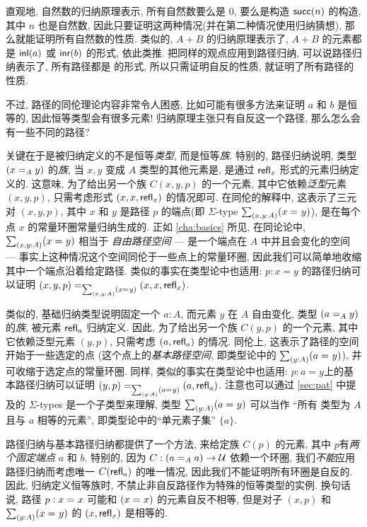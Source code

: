 \begin{rmk}
    \label{rmk:the-only-path-is-refl}
    直观地, 自然数的归纳原理表示, 所有自然数要么是 $0$, 要么是构造 $\suc(n)$ 的构造, 其中 $n$ 也是自然数, 因此只要证明这两种情况(并在第二种情况使用归纳猜想), 那么就能证明所有自然数的性质.
    类似的, $A+B$ 的归纳原理表示了, $A+B$ 的元素都是 $\inl(a)$ 或 $\inr(b)$ 的形式, 依此类推.
    把同样的观点应用到路径归纳, 可以说路径归纳表示了, 所有路径都是  的形式, 所以只需证明自反的性质, 就证明了所有路径的性质.

    不过, 路径的同伦理论内容非常令人困惑, 比如可能有很多方法来证明 $a$ 和 $b$ 是恒等的, 因此恒等类型会有很多元素!
    归纳原理主张只有自反这一个路径, 那么怎么会有一些不同的路径?

    关键在于是被归纳定义的不是恒等\emph{类型}, 而是恒等\emph{族}.
    特别的, 路径归纳说明, 类型 $(\id[A]{x}{y})$ 的\emph{族},  当 $x,y$ 变成 $A$ 类型的其他元素是, 是通过 $\refl{x}$ 形式的元素归纳定义的.
    这意味, 为了给出另一个族 $C(x,y,p)$ 的一个元素, 其中它依赖\emph{泛型}元素 $(x,y,p)$, 只需考虑形式 $(x,x,\refl{x})$ 的情况即可.
    在同伦的解释中, 这表示了三元对 $(x,y,p)$, 其中 $x$ 和 $y$ 是路径 $p$ 的端点(即 $\Sigma$-type $\sm{x,y:A}(\id{x}{y})$), 是在每个点 $x$ 的常量环圈常量归纳生成的.
    正如 \cref{cha:basics} 所见, 在同论论中, $\sm{x,y:A}(\id{x}{y})$ 相当于 \emph{自由路径空间} --- 是一个端点在 $A$ 中并且会变化的空间 --- 事实上这种情况这个空间同伦于一些点上的常量环圈, 因此我们可以简单地收缩其中一个端点沿着给定路径.
    类似的事实在类型论中也适用: $p:x=y$ 的路径归纳可以证明 $\id[\sm{x,y:A}(\id{x}{y})]{(x,y,p)}{(x,x,\refl{x})}$.

    类似的, 基础归纳类型说明固定一个 $a:A$, 而元素 $y$ 在 $A$ 自由变化, 类型 $(\id[A]{a}{y})$ 的\emph{族}, 被元素 $\refl{a}$ 归纳定义.
    因此, 为了给出另一个族 $C(y,p)$ 的一个元素, 其中它依赖泛型元素 $(y,p)$, 只需考虑 $(a,\refl{a})$ 的情况.
    同伦上, 这表示了路径的空间开始于一些选定的点 (这个点上的\emph{基本路径空间}, 即类型论中的 $\sm{y:A} (\id{a}{y})$), 并可收缩于选定点的常量环圈.
    同样, 类似的事实在类型论中也适用: $p:a=y$上的基本路径归纳可以证明 $\id[\sm{y:A}(\id{a}{y})]{(y,p)}{(a,\refl{a})}$.
    注意也可以通过 \cref{sec:pat} 中提及的 $\Sigma$-types 是一个子类型来理解, 类型 $\sm{y:A}(\id{a}{y})$ 可以当作 ``所有 类型为 $A$ 且与 $a$ 相等的元素'', 即类型论中的``单元素子集'' $\{a\}$.

    路径归纳与基本路径归纳都提供了一个方法, 来给定族 $C(p)$ 的元素, 其中 $p$有\emph{两个固定端点} $a$ 和 $b$.
    特别的, 因为 $C: (\id[A]{a}{a}) \to \UU$ 依赖一个环圈, 我们\emph{不能}应用路径归纳而考虑唯一 $C(\refl{a})$ 的唯一情况, 因此我们不能证明所有环圈是自反的.
    因此, 归纳定义恒等族时, 不禁止非自反路径作为特殊的恒等类型的实例.
    换句话说, 路径 $p:\id{x}{x}$ 可能和 $(\id{x}{x})$ 的元素自反不相等, 但是对子 $(x,p)$ 和 $\sm{y:A}(\id{x}{y})$ 的 $(x,\refl{x})$ 是相等的.


\end{rmk}
